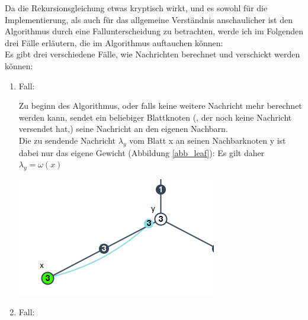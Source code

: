 Da die Rekursionsgleichung etwas kryptisch wirkt, und es sowohl für die Implementierung, als auch für das allgemeine Verständnis anschaulicher ist den Algorithmus durch eine Fallunterscheidung zu betrachten, werde ich im Folgenden drei Fälle erläutern, die im Algorithmus auftauchen können:\\
Es gibt drei verschiedene Fälle, wie Nachrichten berechnet und verschickt werden können:

\begin{enumerate}
	
	\item Fall:
		
		Zu beginn des Algorithmus, oder falls keine weitere Nachricht mehr berechnet werden kann, sendet ein beliebiger Blattknoten (, der noch keine Nachricht versendet hat,) seine Nachricht an den eigenen Nachbarn.\\
		
		Die zu sendende Nachricht $\lambda_{y}$ vom Blatt x an seinen Nachbarknoten y ist dabei nur das eigene Gewicht (Abbildung \ref{abb_leaf}): Es gilt daher $\lambda_{y} = \omega(x)$
		
		\includegraphics[width=\textwidth]{bilder/abb_blattknoten.png}
		\label{abb_leaf}
		
	
			
	\item Fall:
	

\end{enumerate}
